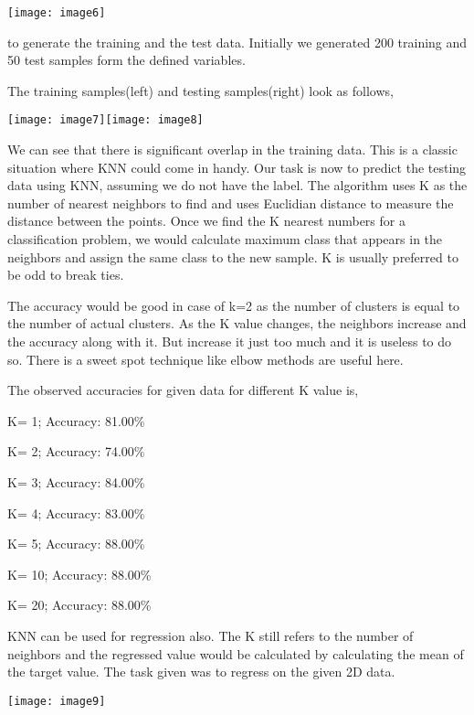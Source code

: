 \documentclass{article} %
\begin{document}
\noindent \texttt{[image: image6]}

\noindent to generate the training and the test data. Initially we generated 200 training and 50 test samples form the defined variables. 

\noindent The training samples(left) and testing samples(right) look as follows,

\noindent \texttt{[image: image7]}\texttt{[image: image8]}

\noindent We can see that there is significant overlap in the training data. This is a classic situation where KNN could come in handy. Our task is now to predict the testing data using KNN, assuming we do not have the label. The algorithm uses K as the number of nearest neighbors to find and uses Euclidian distance to measure the distance between the points. Once we find the K nearest numbers for a classification problem, we would calculate maximum class that appears in the neighbors and assign the same class to the new sample. K is usually preferred to be odd to break ties. 

\noindent The accuracy would be good in case of k=2 as the number of clusters is equal to the number of actual clusters. As the K value changes, the neighbors increase and the accuracy along with it. But increase it just too much and it is useless to do so. There is a sweet spot technique like elbow methods are useful here. 

\noindent The observed accuracies for given data for different K value is, 

\noindent K= 1; Accuracy: 81.00\%

\noindent K= 2; Accuracy: 74.00\%

\noindent K= 3; Accuracy: 84.00\%

\noindent K= 4; Accuracy: 83.00\%

\noindent K= 5; Accuracy: 88.00\%

\noindent K= 10; Accuracy: 88.00\%

\noindent K= 20; Accuracy: 88.00\%

\noindent KNN can be used for regression also. The K still refers to the number of neighbors and the regressed value would be calculated by calculating the mean of the target value. The task given was to regress on the given 2D data. 

\noindent \texttt{[image: image9]}
\end{document}

